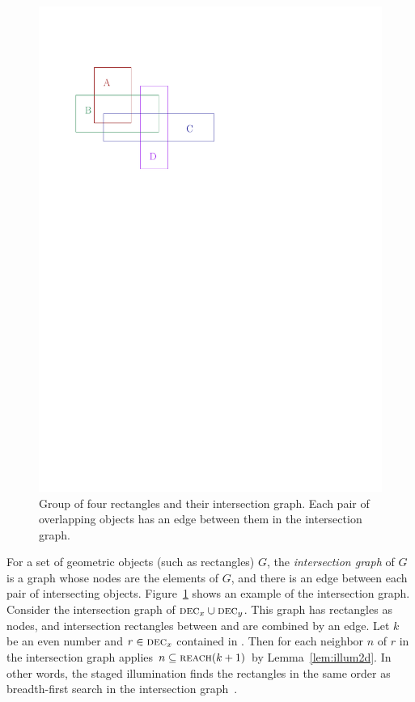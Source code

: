 \documentclass[english,gradu]{tktltiki2018}
\begin{document}
\begin{figure}
	\includegraphics[scale=0.7,page=2]{fig/inter}
	\caption{Group of four rectangles and their intersection graph. Each pair of overlapping objects has an edge between them in the intersection graph.}\label{fig:inter}
\end{figure}

For a set of geometric objects (such as rectangles) $G$, the \emph{intersection graph} of $G$ is a graph whose nodes are the elements of $G$, and there is an edge between each pair of intersecting objects.
Figure~\ref{fig:inter} shows an example of the intersection graph.
Consider the intersection graph of $\textsc{dec}_{x}\cup\textsc{dec}_{y}$.
This graph has rectangles as nodes, and intersection rectangles between  and  are combined by an edge.
Let $k$ be an even number and $r\in\textsc{dec}_{x}$ contained in .
Then for each neighbor $n$ of $r$ in the intersection graph applies $n\subseteq\textsc{reach}(k+1)$ by Lemma~\ref{lem:illum2d}.
In other words, the staged illumination finds the rectangles in the same order as breadth-first search in the intersection graph~\cite{dasnar}.
\end{document}
